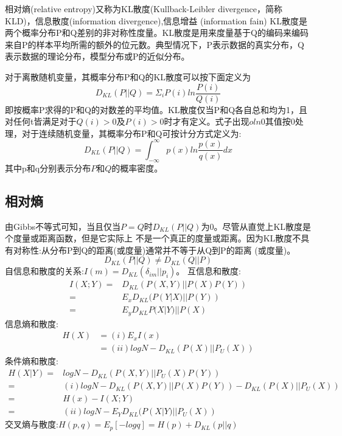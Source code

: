 相对熵(relative entropy)又称为KL散度(Kullback-Leibler divergence，简称KLD)，信息散度(information divergence),信息增益
(information fain)
KL散度是两个概率分布P和Q差别的非对称性度量。KL散度是用来度量基于Q的编码来编码来自P的样本平均所需的额外的位元数。典型情况下，P表示数据的真实分布，Q表示数据的理论分布，模型分布或P的近似分布。

对于离散随机变量，其概率分布P和Q的KL散度可以按下面定义为
\begin{equation}
D_{KL}(P||Q)=\Sigma_iP(i)ln\frac{P(i)}{Q(i)}
\end{equation}
即按概率P求得的P和Q的对数差的平均值。KL散度仅当P和Q各自总和均为1，且对任何t皆满足对于$Q(i)>0$及$P(i)>0$时才有定义。式子出现$oln0$其值按0处理，对于连续随机变量，其概率分布P和Q可按计分方式定义为:
\begin{equation}
D_{KL}(P||Q)=\int_{-\infty}^{\infty}p(x)ln\frac{p(x)}{q(x)}dx
\end{equation}
其中p和q分别表示分布$P$和$Q$的概率密度。
\subsection{相对熵}
由Gibbs不等式可知，当且仅当$P=Q$时$D_{KL}(P||Q)$为0。尽管从直觉上KL散度是个度量或距离函数，但是它实际上
不是一个真正的度量或距离。因为KL散度不具有对称性:从分布P到Q的距离(或度量)通常并不等于从Q到P的距离
(或度量)。
\[D_{KL}(P||Q)\neq D_{KL}(Q||P)\]
自信息和散度的关系:$I(m)=D_{KL}(\delta_{im}||{p_i})$。
互信息和散度:
\begin{align*}
I(X;Y)=&D_{KL}(P(X,Y)||P(X)P(Y))\\
      =&E_x{D_{KL}(P(Y|X)||P(Y))}\\
      =&E_y{D_{KL}P(X|Y)||P(X)}
\end{align*}
信息熵和散度:
\begin{align*}
H(X)&=(i)E_x{I(x)}\\
    &=(ii)logN-D_{KL}(P(X)||P_U(X))
\end{align*}
条件熵和散度:
\begin{align*}
H(X|Y)=&logN-D_{KL}(P(X,Y)||P_U(X)P(Y))\\
      =&(i)logN-D_{KL}(P(X,Y)||P(X)P(Y))-D_{KL}(P(X)||P_U(X))\\
      =&H(x)-I(X;Y)\\
      =&(ii)logN-E_Y{D_{KL}(P(X|Y)||P_U(X))} 
\end{align*}
交叉熵与散度:$H(p,q)=E_p[-logq]=H(p)+D_{KL}(p||q)$
